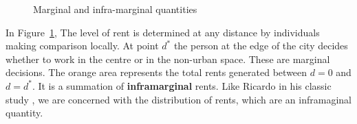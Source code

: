\begin{figure}[h!t!]
    \centering
   \caption{Marginal and infra-marginal quantities}
    \label{fig-land-rent-as-inframarginal}
\end{figure}


In Figure~\ref{fig-land-rent-as-inframarginal}, The level of rent is determined at any distance by individuals making comparison locally. At point $d^*$ the person at the edge of the city decides whether to work in the centre or in the non-urban space. These are \gls{marginal} decisions. The orange area represents  the total rents generated between $d=0$ and $d=d^*$. It is a summation of \textbf{\gls{inframarginal}} rents. Like Ricardo in his classic study \cite{ricardoEssayInfluenceLow1815}, we are concerned with the distribution of rents, which are an  inframaginal quantity.




